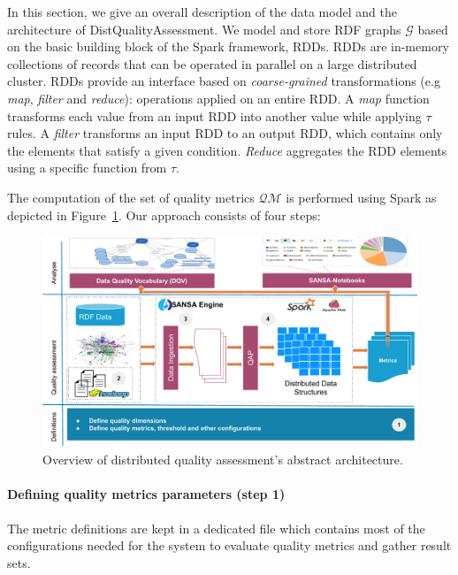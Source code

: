 In this section, we give an overall description of the data model and the architecture of DistQualityAssessment.
We model and store RDF graphs $\mathcal{G}$ based on the basic building block of the Spark framework, RDDs. 
RDDs are in-memory collections of records that can be operated in parallel on a large distributed cluster.
RDDs provide an interface based on \emph{coarse-grained} transformations (e.g \emph{map}, \emph{filter} and \emph{reduce}): operations applied on an entire RDD. 
A \emph{map} function transforms each value from an input RDD into another value while applying $\tau$ rules.
A \emph{filter} transforms an input RDD to an output RDD, which contains only the elements that satisfy a given condition.
\emph{Reduce} aggregates the RDD elements using a specific function from $\tau$.

The computation of the set of quality metrics $\mathcal{QM}$ is performed using Spark as depicted in Figure~\ref{fig:DistQualityAssessmentSystem}.
Our approach consists of four steps: 

\begin{figure}
\centering
\includegraphics[width=1.0\columnwidth]{images/5_distqualityassessment/distqualityassessment-architecture.pdf}
\caption{Overview of distributed quality assessment's abstract architecture.}
\label{fig:DistQualityAssessmentSystem}
\end{figure}

\paragraph{Defining quality metrics parameters (step 1)} The metric definitions are kept in a dedicated file which contains most of the configurations needed for the system to evaluate quality metrics and gather result sets.

